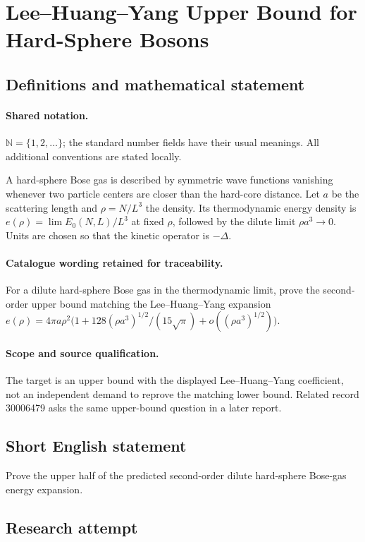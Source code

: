 \documentclass[11pt]{article}
\begin{document}
\section{Lee–Huang–Yang Upper Bound for Hard-Sphere Bosons}\label{statement}

\subsection{Definitions and mathematical statement}

\paragraph{Shared notation.}$\mathbb N=\{1,2,\ldots\}$; the standard number fields have their usual meanings. All additional conventions are stated locally.


A hard-sphere Bose gas is described by symmetric wave functions vanishing whenever two particle centers are closer than the hard-core distance. Let $a$ be the scattering length and $\rho=N/L^3$ the density. Its thermodynamic energy density is $e(\rho)=\lim E_0(N,L)/L^3$ at fixed $\rho$, followed by the dilute limit $\rho a^3\to0$. Units are chosen so that the kinetic operator is $-\Delta$.

\paragraph{Catalogue wording retained for traceability.}
For a dilute hard-sphere Bose gas in the thermodynamic limit, prove the second-order upper bound matching the Lee–Huang–Yang expansion $e(\rho)=4\pi a\rho^2\bigl(1+128(\rho a^3)^{1/2}/(15\sqrt\pi)+o((\rho a^3)^{1/2})\bigr)$.

\paragraph{Scope and source qualification.}The target is an upper bound with the displayed Lee--Huang--Yang coefficient, not an independent demand to reprove the matching lower bound. Related record 30006479 asks the same upper-bound question in a later report.
\subsection{Short English statement}
Prove the upper half of the predicted second-order dilute hard-sphere Bose-gas energy expansion.
\subsection{Research attempt}
\end{document}
